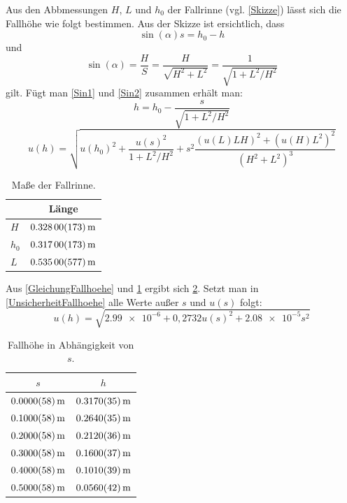 \documentclass[
	a4paper,
	12pt,
	pagesize,
	ngerman
]{scrartcl}
\begin{document}
	Aus den Abbmessungen $H$, $L$ und $h_0$ der Fallrinne (vgl. \cref{Skizze}) lässt sich die Fallhöhe wie folgt bestimmen. Aus der Skizze ist ersichtlich, dass 
	\begin{equation}
		\sin(\alpha) s = h_0-h 
		\label{Sin1}
	\end{equation}
	und
	\begin{equation}
		\sin(\alpha) = \frac{H}{S} = \frac{H}{\sqrt{H^2+L^2}} = \frac{1}{\sqrt{1+L^2/H^2}}
		\label{Sin2}
	\end{equation}
	gilt. Fügt man \cref{Sin1} und \cref{Sin2} zusammen erhält man:
	\begin{equation}
		h = h_0 - \frac{s}{\sqrt{1+ L^2/H^2}}
		\label{GleichungFallhoehe}
	\end{equation}
	\begin{equation}
		u(h) = \sqrt{u(h_0)^2 + \frac{u(s)^2}{1+L^2/H^2} + s^2\frac{(u(L)LH)^2 + (u(H)L^2)^2}{(H^2 + L^2)^3} }
		\label{UnsicherheitFallhoehe}
	\end{equation}
	\begin{table}[tb]
	\centering
	\begin{tabular}{  l | c  }
		& Länge  \\ \hline 
		$H$ &  $\SI{0,328 \pm 0,00173}{m}$ \\ \hline 
		$h_0$ &  $\SI{0,317 \pm 0,00173}{m}$ \\ \hline 
		$L$ &  $\SI{0,535 \pm 0,00577}{m}$ 
	\end{tabular}
	\caption{Maße der Fallrinne.}
	\label{MessungFallrinne}
	\end{table}
	Aus \cref{GleichungFallhoehe} und \cref{MessungFallrinne} ergibt sich \cref{TabelleFallhoehe}. Setzt man in \cref{UnsicherheitFallhoehe} alle Werte außer $s$ und $u(s)$ folgt:
	\begin{equation}
		u(h) = \sqrt{ \SI{2,99e-6}+ 0,2732u(s)^2 + \SI{2,08e-5}s^2 }
	\end{equation}
	\begin{table}[tb]
	\centering
	\begin{tabular}{  c | c  }
		$s$  & $h$ \\ \hline 
		$\SI{0,00 \pm 0,0058}{m}$ &  $\SI{0,317 \pm 0,0035}{m}$ \\ \hline
		$\SI{0,10 \pm 0,0058}{m}$ &  $\SI{0,264 \pm 0,0035}{m}$ \\ \hline 
		$\SI{0,20 \pm 0,0058}{m}$ &  $\SI{0,212 \pm 0,0036}{m}$ \\ \hline
		$\SI{0,30 \pm 0,0058}{m}$ &  $\SI{0,160 \pm 0,0037}{m}$ \\ \hline
		$\SI{0,40 \pm 0,0058}{m}$ &  $\SI{0,101 \pm 0,0039}{m}$ \\ \hline 
		$\SI{0,50 \pm 0,0058}{m}$ &  $\SI{0,056 \pm 0,0042}{m}$  
	\end{tabular}
	\caption{Fallhöhe in Abhängigkeit von $s$.}
		\label{TabelleFallhoehe}
	\end{table}
\end{document}
